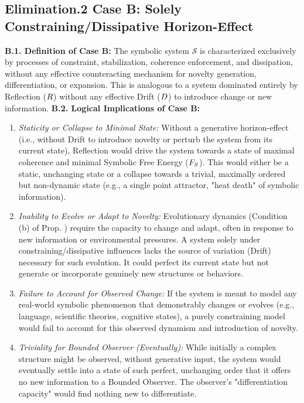 \subsection{Elimination.2 Case B: Solely Constraining/Dissipative Horizon-Effect} \label{subsec:appC_case_b_solely_constraining_dissipative_horizon_effect}
\textbf{B.1. Definition of Case B:} The symbolic system \(\mathcal{S}\) is characterized exclusively by processes of constraint, stabilization, coherence enforcement, and dissipation, without any effective counteracting mechanism for novelty generation, differentiation, or expansion. This is analogous to a system dominated entirely by Reflection (\(R\)) without any effective Drift (\(D\)) to introduce change or new information.
\textbf{B.2. Logical Implications of Case B:}
\begin{enumerate}
    \item \emph{Staticity or Collapse to Minimal State:} Without a generative horizon-effect (i.e., without Drift to introduce novelty or perturb the system from its current state), Reflection would drive the system towards a state of maximal coherence and minimal Symbolic Free Energy (\(F_S\)). This would either be a static, unchanging state or a collapse towards a trivial, maximally ordered but non-dynamic state (e.g., a single point attractor, "heat death" of symbolic information).
    \item \emph{Inability to Evolve or Adapt to Novelty:} Evolutionary dynamics (Condition (b) of Prop. ) require the capacity to change and adapt, often in response to new information or environmental pressures. A system solely under constraining/dissipative influences lacks the source of variation (Drift) necessary for such evolution. It could perfect its current state but not generate or incorporate genuinely new structures or behaviors.
    \item \emph{Failure to Account for Observed Change:} If the system is meant to model any real-world symbolic phenomenon that demonstrably changes or evolves (e.g., language, scientific theories, cognitive states), a purely constraining model would fail to account for this observed dynamism and introduction of novelty.
    \item \emph{Triviality for Bounded Observer (Eventually):} While initially a complex structure might be observed, without generative input, the system would eventually settle into a state of such perfect, unchanging order that it offers no new information to a Bounded Observer. The observer's "differentiation capacity" would find nothing new to differentiate.
\end{enumerate}
